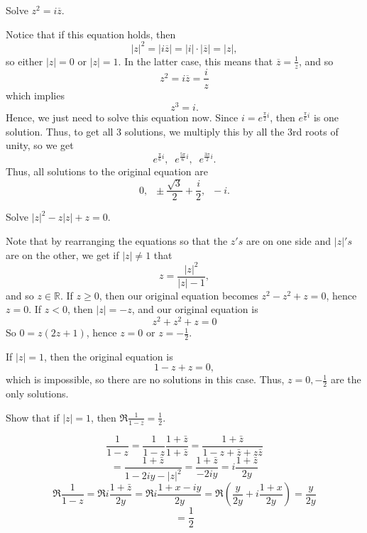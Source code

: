 \documentclass[11pt,dvipsnames]{book}
\def\R{\mathbb{R}}
\numberwithin{figure}{section} %
\numberwithin{table}{section} %
\begin{document}
\begin{exercise} Solve $z^2=i\overline{z}$.

\begin{solution}
Notice that if this equation holds, then
\[
|z|^2=|i\overline{z}|=|i|\cdot |\overline{z}| = |z|,\]
so either $|z|=0$ or $|z|=1$. In the latter case, this means that $\overline{z} = \frac{1}{z}$, and so
\[
z^2=i\overline{z} = \frac{i}{z}\]
which implies
\[
z^3=i.
\]
Hence, we just need to solve this equation now. Since $i=e^{\frac{\pi}{2}i}$, then $e^{\frac{\pi}{6}i}$ is one solution. Thus, to get all 3 solutions, we multiply this by all the 3rd roots of unity, so we get
\[
e^{\frac{\pi}{6}i}, \;\; e^{\frac{5\pi}{6}i}, \;\; e^{\frac{3\pi}{2}i}.
\]
Thus, all solutions to the original equation are
\[
0, \;\; \pm \frac{\sqrt{3}}{2}+\frac{i}{2}, \;\; -i.
\]

\end{solution}

\end{exercise}

\begin{exercise} Solve $|z|^2 - z|z| + z = 0$.

\begin{solution}
Note that by rearranging the equations so that the $z's$ are on one side and $|z|'s$ are on the other, we get if $|z|\neq 1$ that
\[
z  =\frac{|z|^{2}}{|z|-1},\]
and so $z\in\R$. If $z\geq 0$, then our original equation becomes $z^2-z^2+z=0$, hence $z=0$. If $z<0$, then $|z|=-z$, and our original equation is
\[
z^2+z^2+z=0\]
So $0=z(2z+1)$, hence $z=0$ or $z=-\frac{1}{2}$.

If $|z|=1$, then the original equation is
\[
1-z+z=0,\]
which is impossible, so there are no solutions in this case. Thus, $z=0,-\frac{1}{2}$ are the only solutions.
\end{solution}

\end{exercise}

\begin{exercise} Show that if $|z| = 1$, then $\Re\frac{1}{1-z} =
\frac{1}{2}$.

\begin{solution}
\[ \frac{1}{1-z} = \frac{1}{1-z}\frac{1+\bar{z}}{1+\bar{z}} =
\frac{1+\bar{z}}{1-z+\bar{z} + z\bar{z}}\]
\[ =
\frac{1+\bar{z}}{1-2iy-|z|^{2}}=\frac{1+\bar{z}}{-2iy}=i\frac{1+\bar{z}}{2y}\]
\[\Re \frac{1}{1-z} = \Re i\frac{1+\bar{z}}{2y} = \Re
i\frac{1+x-iy}{2y} = \Re\left(\frac{y}{2y} + i\frac{1+x}{2y}\right) =
\frac{y}{2y}\]
\[=\frac{1}{2}\]
\end{solution}

\end{exercise}
\end{document}
